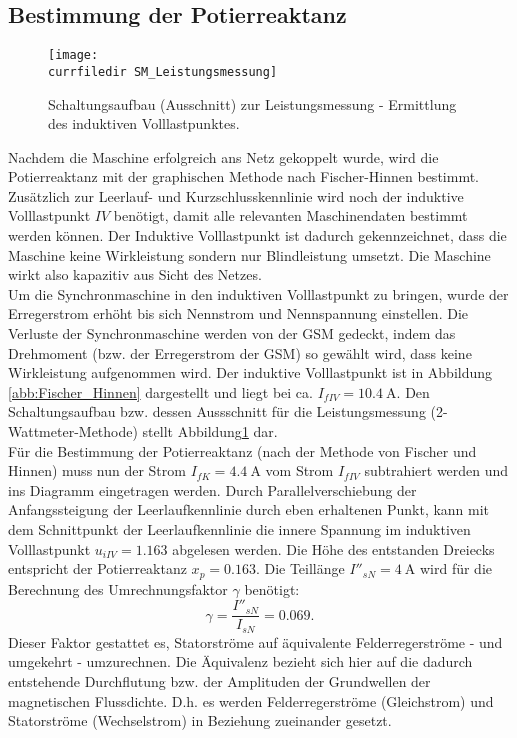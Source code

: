 \subsection{Bestimmung der Potierreaktanz}
\label{subsec:potierreaktanz}
\begin{figure}
    \centering
    \texttt{[image: \\currfiledir SM\_Leistungsmessung]}
    \caption{Schaltungsaufbau (Ausschnitt) zur Leistungsmessung - Ermittlung des induktiven Volllastpunktes.}
    \label{fig:SM_Leistungsmessung}
\end{figure}
Nachdem die Maschine erfolgreich ans Netz gekoppelt wurde, wird die Potierreaktanz mit der graphischen Methode nach Fischer-Hinnen bestimmt.\\
Zusätzlich zur Leerlauf- und Kurzschlusskennlinie wird noch der induktive Volllastpunkt $IV$ benötigt, damit alle relevanten Maschinendaten bestimmt werden können. Der Induktive Volllastpunkt ist dadurch gekennzeichnet, dass die Maschine keine Wirkleistung sondern nur Blindleistung umsetzt. Die Maschine wirkt also kapazitiv aus Sicht des Netzes.\\
Um die Synchronmaschine in den induktiven Volllastpunkt zu bringen, wurde der Erregerstrom erhöht bis sich Nennstrom und Nennspannung einstellen. Die Verluste der Synchronmaschine werden von der GSM gedeckt, indem das Drehmoment (bzw. der Erregerstrom der GSM) so gewählt wird, dass keine Wirkleistung aufgenommen wird. Der induktive Volllastpunkt ist in Abbildung \ref{abb:Fischer_Hinnen} dargestellt und liegt bei ca. $I_{fIV} = \SI{10.4}{\ampere}$. Den Schaltungsaufbau bzw. dessen Aussschnitt für die Leistungsmessung (2-Wattmeter-Methode) stellt Abbildung\;\ref{fig:SM_Leistungsmessung} dar.\\
Für die Bestimmung der Potierreaktanz (nach der Methode von Fischer und Hinnen) muss nun der Strom $I_{fK}= \SI{4.4}{\ampere}$ vom Strom $I_{fIV}$ subtrahiert werden und ins Diagramm eingetragen werden. Durch Parallelverschiebung der Anfangssteigung der Leerlaufkennlinie durch eben erhaltenen Punkt, kann mit dem Schnittpunkt der Leerlaufkennlinie die innere Spannung im induktiven Volllastpunkt $u_{iIV} = 1.163$ abgelesen werden. Die Höhe des entstanden Dreiecks entspricht der Potierreaktanz $x_p = 0.163$. Die Teillänge $I''_{sN}= \SI{4}{\ampere}$ wird für die Berechnung des Umrechnungsfaktor $\gamma$ benötigt:
\begin{equation*}
    \gamma = \frac{I''_{sN}}{I_{sN}} = 0.069.
\end{equation*}
Dieser Faktor gestattet es, Statorströme auf äquivalente Felderregerströme - und umgekehrt - umzurechnen. Die Äquivalenz bezieht sich hier auf die dadurch entstehende Durchflutung bzw. der Amplituden der Grundwellen der magnetischen Flussdichte. D.h. es werden Felderregerströme (Gleichstrom) und Statorströme (Wechselstrom) in Beziehung zueinander gesetzt.\\
